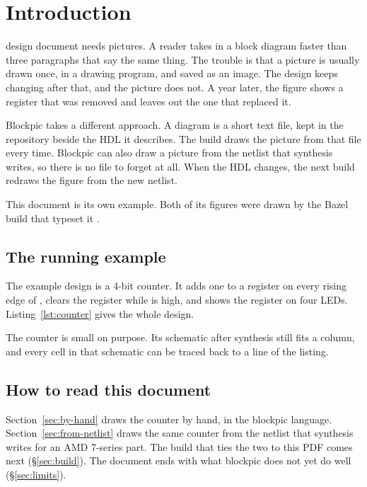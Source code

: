 \section{Introduction}
\label{sec:intro}

 design document needs pictures. A reader takes in a
block diagram faster than three paragraphs that say the same thing. The
trouble is that a picture is usually drawn once, in a drawing program, and
saved as an image. The design keeps changing after that, and the picture
does not. A year later, the figure shows a register that was removed and
leaves out the one that replaced it.

Blockpic takes a different approach. A diagram is a short text file, kept in
the repository beside the HDL it describes. The build draws the picture from
that file every time. Blockpic can also draw a picture from the netlist that
synthesis writes, so there is no file to forget at all. When the HDL
changes, the next build redraws the figure from the new netlist.

This document is its own example. Both of its figures were drawn by the
Bazel build that typeset it \cite{bazel}.

\subsection{The running example}

The example design is a 4-bit counter. It adds one to a register on every
rising edge of , clears the register while  is high,
and shows the register on four LEDs. Listing~\ref{lst:counter} gives the
whole design.



The counter is small on purpose. Its schematic after synthesis still fits a
column, and every cell in that schematic can be traced back to a line of the
listing.

\subsection{How to read this document}

Section~\ref{sec:by-hand} draws the counter by hand, in the blockpic
language. Section~\ref{sec:from-netlist} draws the same counter from the
netlist that synthesis writes for an AMD 7-series part. The build that ties
the two to this PDF comes next (\S\ref{sec:build}). The document ends with
what blockpic does not yet do well (\S\ref{sec:limits}).
